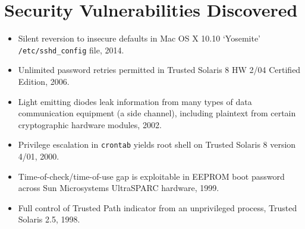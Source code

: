 \vspace{2mm}
\section*{Security Vulnerabilities Discovered}

\vspace{-2mm}
\begin{itemize}
    \item Silent reversion to insecure defaults in Mac OS X 10.10 `Yosemite'
        \texttt{/etc/sshd\_config} file, 2014.\vspace{-2.5mm}
	\item Unlimited password retries permitted in Trusted Solaris 8 HW 2/04
		Certified Edition, 2006.\vspace{-2.5mm}
	\item Light emitting diodes leak information from many types of data
		communication equipment (a side channel), including plaintext from
		certain cryptographic hardware modules, 2002.\vspace{-2.5mm}
	\item Privilege escalation in \verb,crontab, yields root shell on Trusted
		Solaris 8 version 4/01, 2000.\vspace{-2.5mm}
    \item Time-of-check/time-of-use gap is exploitable in EEPROM boot
        password across Sun Microsystems UltraSPARC hardware, 1999.\vspace{-2.5mm}
	\item Full control of Trusted Path indicator from an unprivileged process,
		Trusted Solaris 2.5, 1998.\vspace{-2.5mm}
\end{itemize}

